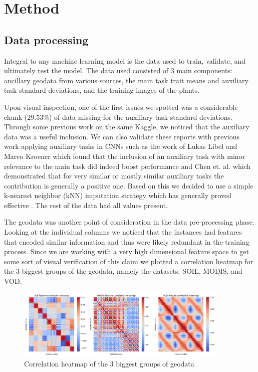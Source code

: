 \documentclass[12pt,a4paper,oneside]{article}
\begin{document}

\section{Method}

\subsection{Data processing}

Integral to any machine learning model is the data used to train, validate, and ultimately test the model. The data used consisted of 3 main components: ancillary geodata from various sources, the main task trait means and auxiliary task standard deviations, and the training images of the plants.

\smallskip 
Upon visual inspection, one of the first issues we spotted was a considerable chunk (29.53\%) of data missing for the auxiliary task standard deviations. Through some previous work on the same Kaggle, we noticed that the auxiliary data was a useful inclusion. We can also validate these reports with previous work applying auxiliary tasks in CNNs such as the work of Lukas Libel and Marco Kroener which found that the inclusion of an auxiliary task with minor relevance to the main task did indeed boost performance \cite{lukaslibel} and Chen et. al. \cite{pmlr-v80-chen18a} which demonstrated that for very similar or mostly similar auxiliary tasks the contribution is generally a positive one. Based on this we decided to use a simple k-nearest neighbor (kNN) imputation strategy which has generally proved effective \cite{joel2024performance}. The rest of the data had all values present.

\smallskip
The geodata was another point of consideration in the data pre-processing phase. Looking at the individual columns we noticed that the instances had features that encoded similar information and thus were likely redundant in the training process. Since we are working with a very high dimensional feature space to get some sort of visual verification of this claim we plotted a correlation heatmap for the 3 biggest groups of the geodata, namely the datasets: SOIL, MODIS, and VOD.

\begin{figure}[!h]
    \centering
    \includegraphics[width=0.9\textwidth]{assets/corr_hm.png}
    \caption{Correlation heatmap of the 3 biggest groups of geodata}
\end{figure}
\end{document}
